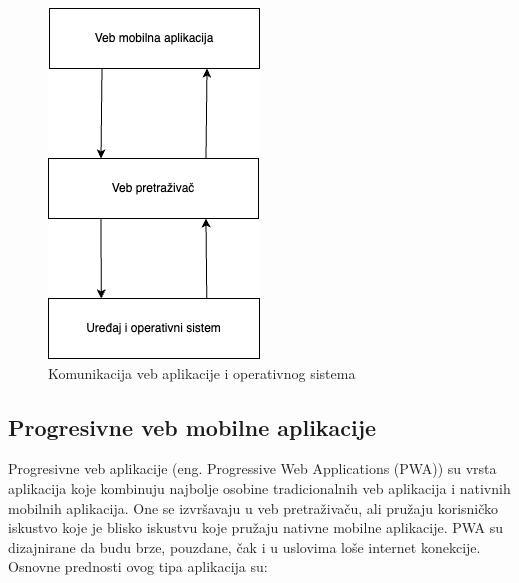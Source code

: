 \documentclass[12pt,oneside]{memoir}
\begin{document}
\begin{figure}[h]
    \centering
    \includegraphics[scale=0.5]{docs/images/chapterTwo/vebMobilnaAplikacija.png}
    \caption{Komunikacija veb aplikacije i operativnog sistema}
    \label{fig:vebMobilnaAplikacija}
\end{figure}

\subsection{Progresivne veb mobilne aplikacije}

Progresivne veb aplikacije\cite{pwa} (eng. Progressive Web Applications (PWA)) su vrsta aplikacija koje kombinuju najbolje osobine tradicionalnih veb aplikacija i nativnih mobilnih aplikacija. One se izvršavaju u veb pretraživaču, ali pružaju korisničko iskustvo koje je blisko iskustvu koje pružaju nativne mobilne aplikacije. PWA su dizajnirane da budu brze, pouzdane, čak i u uslovima loše internet konekcije. Osnovne prednosti ovog tipa aplikacija su:
\end{document}
